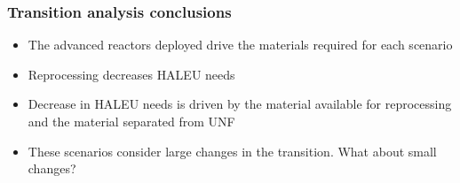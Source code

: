 \begin{frame}
    \frametitle{Transition analysis conclusions}
    \begin{itemize}
        \item The advanced reactors deployed drive the materials required 
              for each scenario
        \item Reprocessing decreases \gls{HALEU} needs 
        \item Decrease in \gls{HALEU} needs is driven by the material 
              available for reprocessing and the material separated 
              from \gls{UNF}
        \item<2-> These scenarios consider large changes in the transition. 
             What about small changes?
    \end{itemize}
\end{frame}